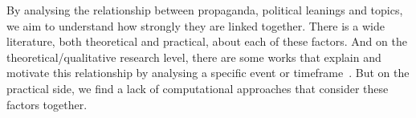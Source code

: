 






By analysing the relationship between propaganda, political leanings and topics, we aim to understand how strongly they are linked together. There is a wide literature, both theoretical and practical, about each of these factors.
And on the theoretical/qualitative research level, there are some works that explain and motivate this relationship by analysing a specific event or timeframe~\citep{pierri2023propaganda,golovchenko2020cross,blumberg1986comparative}.
But on the practical side, we find a lack of computational approaches that consider these factors together.

